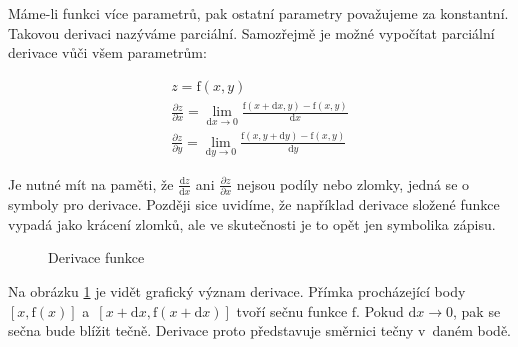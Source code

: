 Máme-li funkci více parametrů, pak ostatní parametry považujeme za konstantní. Takovou derivaci nazýváme parciální. Samozřejmě je možné vypočítat parciální derivace vůči všem parametrům:

\begin{equation}
\begin{split}
z =\mathrm{f}(x, y) \\
\frac{\partial z}{\partial x} = \lim_{\mathrm{d}x \to 0} \frac{\mathrm{f}(x + \mathrm{d}x, y) - \mathrm{f}(x, y)}{\mathrm{d}x} \\
\frac{\partial z}{\partial y} = \lim_{\mathrm{d}y \to 0} \frac{\mathrm{f}(x, y + \mathrm{d}y) - \mathrm{f}(x, y)}{\mathrm{d}y}
\end{split}
\end{equation}

Je nutné mít na paměti, že \(\frac{\mathrm{d}z}{\mathrm{d}x}\) ani \(\frac{\partial z}{\partial x}\) nejsou podíly nebo zlomky, jedná se o symboly pro derivace. Později sice uvidíme, že například derivace složené funkce vypadá jako krácení zlomků, ale ve skutečnosti je to opět jen symbolika zápisu.

\begin{figure}
\begin{center}
\caption{Derivace funkce}
\end{center}
\label{img:derivace}
\end{figure}

Na obrázku \ref{img:derivace} je vidět grafický význam derivace. Přímka procházející body \([x, \mathrm{f}(x)]\) a~\([x + \mathrm{d}x, \mathrm{f}(x + \mathrm{d}x)]\) tvoří sečnu funkce \(\mathrm{f}\). Pokud \(\mathrm{d}x \to 0\), pak se sečna bude blížit tečně. Derivace proto představuje směrnici tečny v~daném bodě.

